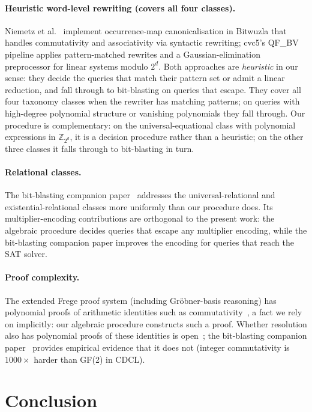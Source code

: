 \documentclass[runningheads]{llncs}
\begin{document}
\paragraph{Heuristic word-level rewriting (covers all four
classes).}
Niemetz et al.~\cite{niemetz2023bitwuzla} implement occurrence-map
canonicalisation in Bitwuzla that handles commutativity and
associativity via syntactic rewriting; cvc5's QF\_BV pipeline
applies pattern-matched rewrites and a Gaussian-elimination
preprocessor for linear systems modulo $2^d$. Both approaches are
\emph{heuristic} in our sense: they decide the queries that match
their pattern set or admit a linear reduction, and fall through
to bit-blasting on queries that escape. They cover all four
taxonomy classes when the rewriter has matching patterns; on
queries with high-degree polynomial structure or vanishing
polynomials they fall through. Our procedure is complementary:
on the universal-equational class with polynomial expressions in
$\mathbb{Z}_{2^d}$, it is a decision procedure rather than a
heuristic; on the other three classes it falls through to
bit-blasting in turn.

\paragraph{Relational classes.}
The bit-blasting companion paper~\cite{companion-bitblasting}
addresses the universal-relational and existential-relational
classes more uniformly than our procedure does. Its
multiplier-encoding contributions are orthogonal to the present
work: the algebraic procedure decides queries that escape any
multiplier encoding, while the bit-blasting companion paper
improves the encoding for queries that reach the SAT solver.

\paragraph{Proof complexity.}
The extended Frege proof system (including Gr\"obner-basis
reasoning) has polynomial proofs of arithmetic identities such
as commutativity~\cite{buss1995bounded}, a fact we rely on
implicitly: our algebraic procedure constructs such a proof.
Whether resolution also has polynomial proofs of
these identities is open~\cite{biere2017challenges}; the
bit-blasting companion paper~\cite{companion-bitblasting}
provides empirical evidence that it does not (integer
commutativity is $1000\times$ harder than GF(2) in CDCL).


\section{Conclusion}
\end{document}
